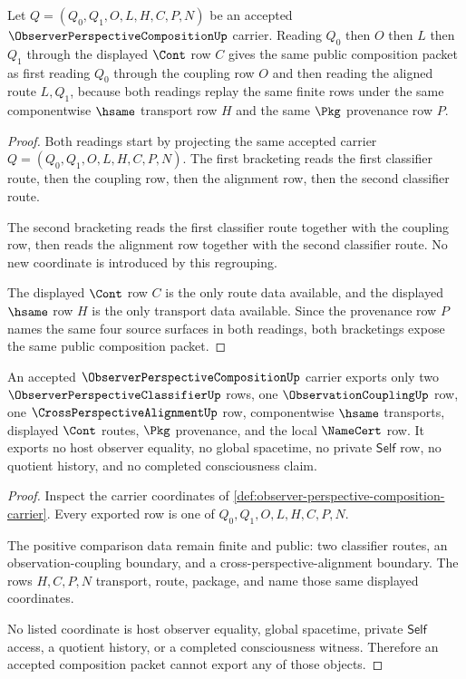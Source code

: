 \begin{theorem}
\label{thm:observer-perspective-composition-route-associativity}
Let $Q=(Q_0,Q_1,O,L,H,C,P,N)$ be an accepted $\ObserverPerspectiveCompositionUp$ carrier. Reading $Q_0$ then $O$ then $L$ then $Q_1$ through the displayed $\Cont$ row $C$ gives the same public composition packet as first reading $Q_0$ through the coupling row $O$ and then reading the aligned route $L,Q_1$, because both readings replay the same finite rows under the same componentwise $\hsame$ transport row $H$ and the same $\Pkg$ provenance row $P$.
\end{theorem}
\begin{proof}
Both readings start by projecting the same accepted carrier $Q=(Q_0,Q_1,O,L,H,C,P,N)$. The first bracketing reads the first classifier route, then the coupling row, then the alignment row, then the second classifier route.

The second bracketing reads the first classifier route together with the coupling row, then reads the alignment row together with the second classifier route. No new coordinate is introduced by this regrouping.

The displayed $\Cont$ row $C$ is the only route data available, and the displayed $\hsame$ row $H$ is the only transport data available. Since the provenance row $P$ names the same four source surfaces in both readings, both bracketings expose the same public composition packet.
\end{proof}

\begin{theorem}
\label{thm:observer-perspective-composition-nonescape}
An accepted $\ObserverPerspectiveCompositionUp$ carrier exports only two $\ObserverPerspectiveClassifierUp$ rows, one $\ObservationCouplingUp$ row, one $\CrossPerspectiveAlignmentUp$ row, componentwise $\hsame$ transports, displayed $\Cont$ routes, $\Pkg$ provenance, and the local $\NameCert$ row. It exports no host observer equality, no global spacetime, no private $\mathsf{Self}$ row, no quotient history, and no completed consciousness claim.
\end{theorem}
\begin{proof}
Inspect the carrier coordinates of \autoref{def:observer-perspective-composition-carrier}. Every exported row is one of $Q_0,Q_1,O,L,H,C,P,N$.

The positive comparison data remain finite and public: two classifier routes, an observation-coupling boundary, and a cross-perspective-alignment boundary. The rows $H,C,P,N$ transport, route, package, and name those same displayed coordinates.

No listed coordinate is host observer equality, global spacetime, private $\mathsf{Self}$ access, a quotient history, or a completed consciousness witness. Therefore an accepted composition packet cannot export any of those objects.
\end{proof}


